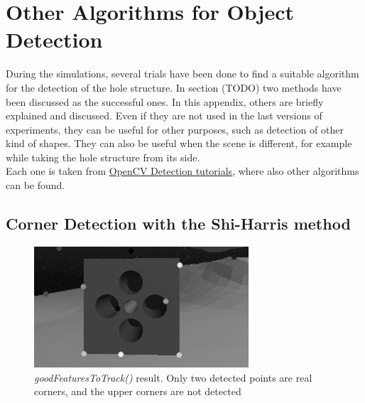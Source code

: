 
\chapter{Other Algorithms for Object Detection}
\label{chap:AppendixVision}
\ifpdf
    \graphicspath{{Vision/Figures/PNG/}{Vision/Figures/PDF/}{Vision/Figures/}}
\else
    \graphicspath{{Vision/Figures/EPS/}{Vision/Figures/}}
\fi

During the simulations, several trials have been done to find a suitable algorithm for the detection of the hole structure. In section (TODO) %
two methods have been discussed as the successful ones. In this appendix, others are briefly explained and discussed. Even if they are not used in the last versions of experiments, they can be useful for other purposes, such as detection of other kind of shapes. They can also be useful when the scene is different, for example while taking the hole structure from its side.\\
Each one is taken from \href{https://docs.opencv.org/3.4/d9/d97/tutorial_table_of_content_features2d.html}{OpenCV Detection tutorials}, where also other algorithms can be found.

\section{Corner Detection with the Shi-Harris method}

\begin{figure}[H]
	\centering
	\includegraphics[width=8.0cm]{goodFeatToTrack}
	\caption{\textit{goodFeaturesToTrack()} result. Only two detected points are real corners, and the upper corners are not detected}
	\label{fig:goodFeatToTrack}
\end{figure}



